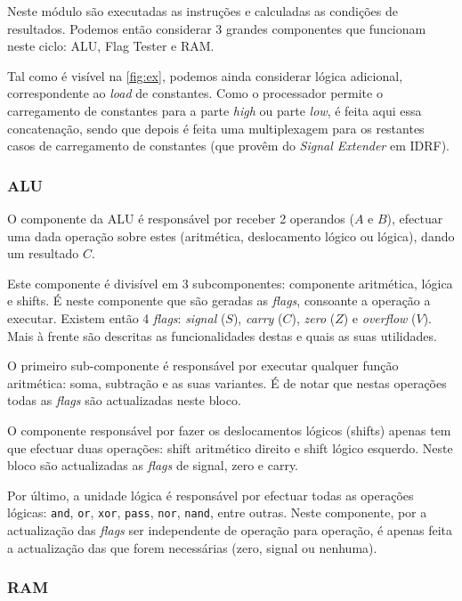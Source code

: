\documentclass[a4paper]{article}
\begin{document}
			Neste módulo são executadas as instruções e calculadas as condições de resultados. Podemos então considerar 3 grandes componentes que funcionam neste ciclo: ALU, Flag Tester e RAM.
			
			Tal como é visível na \autoref{fig:ex}, podemos ainda considerar lógica adicional, correspondente ao \textit{load} de constantes. Como o processador permite o carregamento de constantes para a parte \textit{high} ou parte \textit{low}, é feita aqui essa concatenação, sendo que depois é feita uma multiplexagem para os restantes casos de carregamento de constantes (que provêm do \textit{Signal Extender} em IDRF).
		
			\subsubsection{ALU}
				
				O componente da ALU é responsável por receber 2 operandos ($A$ e $B$), efectuar uma dada operação sobre estes (aritmética, deslocamento lógico ou lógica), dando um resultado $C$.
				
				Este componente é divisível em 3 subcomponentes: componente aritmética, lógica e shifts. É neste componente que são geradas as \textit{flags}, consoante a operação a executar. Existem então 4 \textit{flags}: \textit{signal} ($S$), \textit{carry} ($C$), \textit{zero} ($Z$) e \textit{overflow} ($V$). Mais à frente são descritas as funcionalidades destas e quais as suas utilidades.
				
				O primeiro sub-componente é responsável por executar qualquer função aritmética: soma, subtração e as suas variantes. É de notar que nestas operações todas as \textit{flags} são actualizadas neste bloco.
				
				O componente responsável por fazer os deslocamentos lógicos (shifts) apenas tem que efectuar duas operações: shift aritmético direito e shift lógico esquerdo. Neste bloco são actualizadas as \textit{flags} de signal, zero e carry.
				
				Por último, a unidade lógica é responsável por efectuar todas as operações lógicas: \texttt{and}, \texttt{or}, \texttt{xor}, \texttt{pass}, \texttt{nor}, \texttt{nand}, entre outras. Neste componente, por a actualização das \textit{flags} ser independente de operação para operação, é apenas feita a actualização das que forem necessárias (zero, signal ou nenhuma).
			
			\subsubsection{RAM}
				
\end{document}
